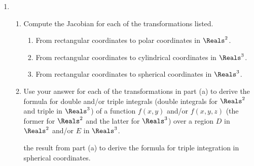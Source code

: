 \documentclass[12pt]{article}
\begin{document}
\begin{enumerate}
		\item \begin{enumerate}
			\item Compute the Jacobian for each of the transformations listed.
			\begin{enumerate}
				\item From rectangular coordinates to polar coordinates in $\Reals^2$.
				\item From rectangular coordinates to cylindrical coordinates in $\Reals^3$.
				\item From rectangular coordinates to spherical coordinates in $\Reals^3$.
			\end{enumerate}
			\item Use your answer for each of the transformations in part (a) to derive the formula for double and/or triple integrals (double integrals for $\Reals^2$ and triple in $\Reals^3$) of a function $f(x,y)$ and/or $f(x,y,z)$ (the former for $\Reals^2$ and the latter for $\Reals^3$) over a region $D$ in $\Reals^2$ and/or $E$ in $\Reals^3$.
			
			 the result from part (a) to derive the formula for triple integration in spherical coordinates.
		\end{enumerate}
	\end{enumerate}
\end{document}
